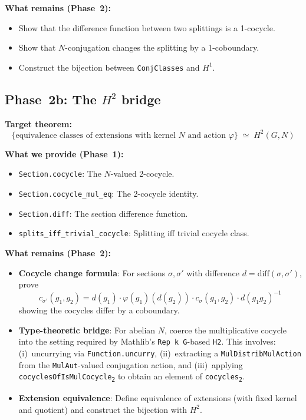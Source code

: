 \documentclass[11pt]{article}
\begin{document}
\textbf{What remains (Phase~2):}
\begin{itemize}[nosep]
\item Show that the difference function between two splittings is a 1-cocycle.
\item Show that $N$-conjugation changes the splitting by a 1-coboundary.
\item Construct the bijection between \texttt{ConjClasses} and $H^1$.
\end{itemize}

\subsection{\texorpdfstring{Phase~2b: The $H^2$ bridge}{Phase 2b: The H2 bridge}}

\textbf{Target theorem:}
\[
  \{\text{equivalence classes of extensions with kernel $N$ and action $\varphi$}\}
  \;\simeq\; H^2(G, N)
\]

\textbf{What we provide (Phase~1):}
\begin{itemize}[nosep]
\item \texttt{Section.cocycle}: The $N$-valued 2-cocycle.
\item \texttt{Section.cocycle\_mul\_eq}: The 2-cocycle identity.
\item \texttt{Section.diff}: The section difference function.
\item \texttt{splits\_iff\_trivial\_cocycle}: Splitting iff trivial cocycle class.
\end{itemize}

\textbf{What remains (Phase~2):}
\begin{itemize}[nosep]
\item \textbf{Cocycle change formula}: For sections $\sigma, \sigma'$ with difference
  $d = \mathrm{diff}(\sigma, \sigma')$, prove
  \[
    c_{\sigma'}(g_1, g_2) = d(g_1) \cdot \varphi(g_1)(d(g_2)) \cdot c_\sigma(g_1, g_2)
    \cdot d(g_1 g_2)^{-1}
  \]
  showing the cocycles differ by a coboundary.

\item \textbf{Type-theoretic bridge}: For abelian $N$, coerce the
  multiplicative cocycle into the setting required by Mathlib's
  \texttt{Rep k G}-based \texttt{H2}. This involves:
  (i)~uncurrying via \texttt{Function.uncurry},
  (ii)~extracting a \texttt{MulDistribMulAction} from the \texttt{MulAut}-valued
  conjugation action, and
  (iii)~applying \texttt{cocyclesOfIsMulCocycle\textsubscript{2}} to obtain an element
  of \texttt{cocycles\textsubscript{2}}.

\item \textbf{Extension equivalence}: Define equivalence of extensions (with fixed
  kernel and quotient) and construct the bijection with $H^2$.
\end{itemize}
\end{document}
